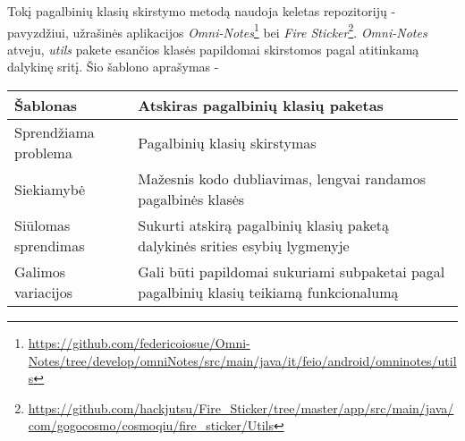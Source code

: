 Tokį pagalbinių klasių skirstymo metodą naudoja keletas repozitorijų - pavyzdžiui, užrašinės aplikacijos \textit{Omni-Notes}\footnote{\url{https://github.com/federicoiosue/Omni-Notes/tree/develop/omniNotes/src/main/java/it/feio/android/omninotes/utils}} bei
\textit{Fire Sticker}\footnote{\url{https://github.com/hackjutsu/Fire_Sticker/tree/master/app/src/main/java/com/gogocosmo/cosmoqiu/fire_sticker/Utils}}.
\textit{Omni-Notes} atveju, \textit{utils} pakete esančios klasės papildomai skirstomos pagal atitinkamą dalykinę sritį.
Šio šablono aprašymas -
\begin{center}
    \begin{tabular}{|p{5cm}|p{10cm}|}
        \hline
        Šablonas &  Atskiras pagalbinių klasių paketas \\ [0.5ex]
        \hline\hline
        Sprendžiama problema & Pagalbinių klasių skirstymas\\
        \hline
        Siekiamybė &  Mažesnis kodo dubliavimas, lengvai randamos pagalbinės klasės \\
        \hline
        Siūlomas sprendimas & Sukurti atskirą pagalbinių klasių paketą dalykinės srities esybių lygmenyje \\
        \hline
        Galimos variacijos & Gali būti papildomai sukuriami subpaketai pagal pagalbinių klasių teikiamą funkcionalumą \\
        \hline
    \end{tabular}
\end{center}

